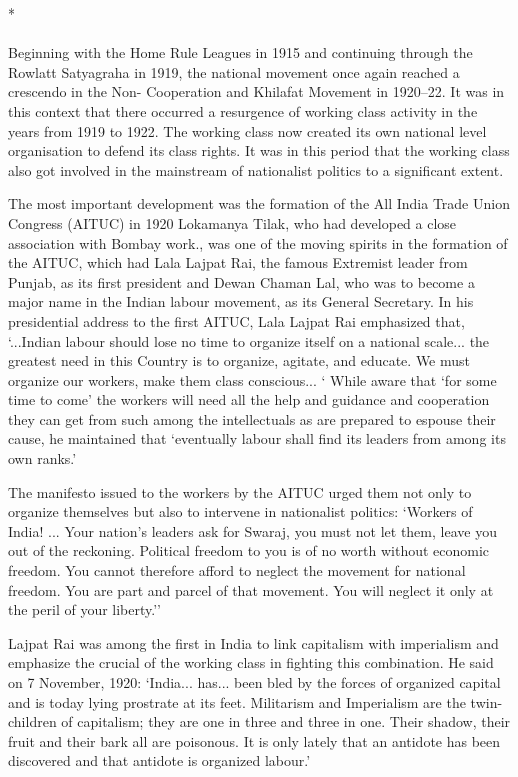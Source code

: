 \begin{center}*\end{center}

\paragraph*{}


Beginning with the Home Rule Leagues in 1915 and continuing through the Rowlatt Satyagraha in 1919, the national movement once again reached a crescendo in the Non- Cooperation and Khilafat Movement in 1920--22. It was in this context that there occurred a resurgence of working class activity in the years from 1919 to 1922. The working class now created its own national level organisation to defend its class rights. It was in this period that the working class also got involved in the mainstream of nationalist politics to a significant extent.

The most important development was the formation of the All India Trade Union Congress (AITUC) in 1920 Lokamanya Tilak, who had developed a close association with Bombay work., was one of the moving spirits in the formation of the AITUC, which had Lala Lajpat Rai, the famous Extremist leader from Punjab, as its first president and Dewan Chaman Lal, who was to become a major name in the Indian labour movement, as its General Secretary. In his presidential address to the first AITUC, Lala Lajpat Rai emphasized that, `...Indian labour should lose no time to organize itself on a national scale... the greatest need in this Country is to organize, agitate, and educate. We must organize our workers, make them class conscious... ` While aware that `for some time to come' the workers will need all the help and guidance and cooperation they can get from such among the intellectuals as are prepared to espouse their cause, he maintained that `eventually labour shall find its leaders from among its own ranks.'

The manifesto issued to the workers by the AITUC urged them not only to organize themselves but also to intervene in nationalist politics: `Workers of India! ... Your nation's leaders ask for Swaraj, you must not let them, leave you out of the reckoning. Political freedom to you is of no worth without economic freedom. You cannot therefore afford to neglect the movement for national freedom. You are part and parcel of that movement. You will neglect it only at the peril of your liberty.''

Lajpat Rai was among the first in India to link capitalism with imperialism and emphasize the crucial of the working class in fighting this combination. He said on 7 November, 1920: `India... has... been bled by the forces of organized capital and is today lying prostrate at its feet. Militarism and Imperialism are the twin-children of capitalism; they are one in three and three in one. Their shadow, their fruit and their bark all are poisonous. It is only lately that an antidote has been discovered and that antidote is organized labour.'

